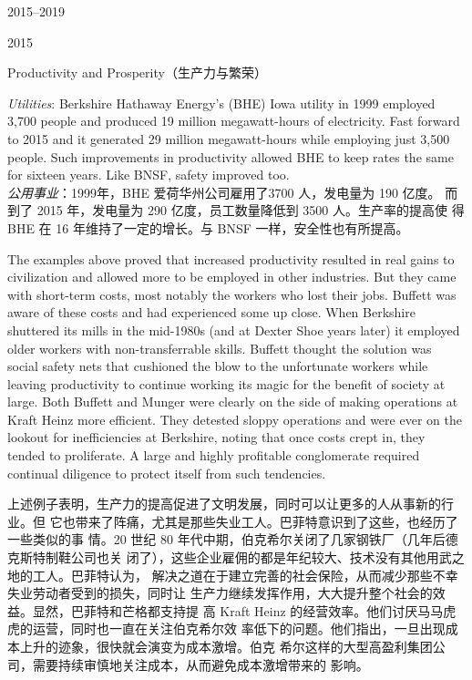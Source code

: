 \begin{chapter}{2015--2019}
\begin{section}{2015}
\begin{subsection}{Productivity and Prosperity（生产力与繁荣）}
\begin{verseparallel}
  {
    \textit{Utilities}: Berkshire Hathaway Energy's (BHE) Iowa utility in 1999
    employed 3,700 people and produced 19 million megawatt-hours of electricity.
    Fast forward to 2015 and it generated 29 million megawatt-hours while
    employing just 3,500 people. Such improvements in productivity allowed BHE
    to keep rates the same for sixteen years. Like BNSF, safety improved too. \\
  }
  {
    \textit{公用事业}：1999年，BHE 爱荷华州公司雇用了3700 人，发电量为 190 亿度。
    而到了 2015 年，发电量为 290 亿度，员工数量降低到 3500 人。生产率的提高使
    得 BHE 在 16 年维持了一定的增长。与 BNSF 一样，安全性也有所提高。
  }
\end{verseparallel}

\begin{verseparallel}
  {

    The examples above proved that increased productivity resulted in real gains
    to civilization and allowed more to be employed in other industries. But
    they came with short-term costs, most notably the workers who lost their
    jobs. Buffett was aware of these costs and had experienced some up close.
    When Berkshire shuttered its mills in the mid-1980s (and at Dexter Shoe
    years later) it employed older workers with non-transferrable skills.
    Buffett thought the solution was social safety nets that cushioned the blow
    to the unfortunate workers while leaving productivity to continue working
    its magic for the benefit of society at large.  Both Buffett and Munger were
    clearly on the side of making operations at Kraft Heinz more efficient. They
    detested sloppy operations and were ever on the lookout for inefficiencies
    at Berkshire, noting that once costs crept in, they tended to proliferate. A
    large and highly profitable conglomerate required continual
    diligence to protect itself from such tendencies. \\

  }
  {
    上述例子表明，生产力的提高促进了文明发展，同时可以让更多的人从事新的行业。但
    它也带来了阵痛，尤其是那些失业工人。巴菲特意识到了这些，也经历了一些类似的事
    情。20 世纪 80 年代中期，伯克希尔关闭了几家钢铁厂（几年后德克斯特制鞋公司也关
    闭了），这些企业雇佣的都是年纪较大、技术没有其他用武之地的工人。巴菲特认为，
    解决之道在于建立完善的社会保险，从而减少那些不幸失业劳动者受到的损失，同时让
    生产力继续发挥作用，大大提升整个社会的效益。显然，巴菲特和芒格都支持提
    高 Kraft Heinz 的经营效率。他们讨厌马马虎虎的运营，同时也一直在关注伯克希尔效
    率低下的问题。他们指出，一旦出现成本上升的迹象，很快就会演变为成本激增。伯克
    希尔这样的大型高盈利集团公司，需要持续审慎地关注成本，从而避免成本激增带来的
    影响。
  }
\end{verseparallel}


\end{subsection}
\end{section}
\end{chapter}
